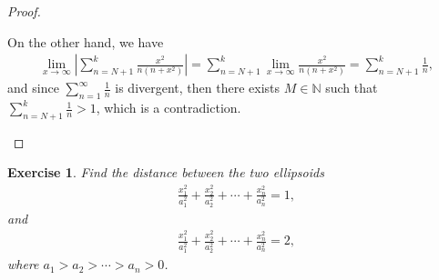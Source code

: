 \documentclass[11pt]{article}
\newtheorem{exercise}{Exercise}[section]
\theoremstyle{definition}
\numberwithin{equation}{subsection}
\begin{document}
\begin{proof}
\begin{enumerate}[label=(\alph*)]
    On the other hand, we have
    \begin{align*}
        \lim_{x\to\infty} \left|\sum^k_{n=N+1} \frac{x^2}{n(n + x^2)} \right| = \sum^k_{n=N+1} \lim_{x\to\infty} \frac{x^2}{n(n + x^2)} = \sum^k_{n=N+1} \frac{1}{n},
    \end{align*}
    and since $\displaystyle \sum^\infty_{n=1} \frac{1}{n}$ is divergent, then there exists $M \in \mathbb{N}$ such that $\displaystyle \sum^k_{n=N+1} \frac{1}{n} > 1$, which is a contradiction.
\end{enumerate}
\end{proof}

\medskip

\begin{exercise}{\rm *}
Find the distance between the two ellipsoids
\begin{align*}
    \frac{x_1^2}{a_1^2} + \frac{x_2^2}{a_2^2} + \cdots + \frac{x_n^2}{a_n^2} = 1,
\end{align*}
and
\begin{align*}
    \frac{x_1^2}{a_1^2} + \frac{x_2^2}{a_2^2} + \cdots + \frac{x_n^2}{a_n^2} = 2,
\end{align*}
where $a_1 > a_2 > \cdots > a_n > 0$.
\end{exercise}
\end{document}
